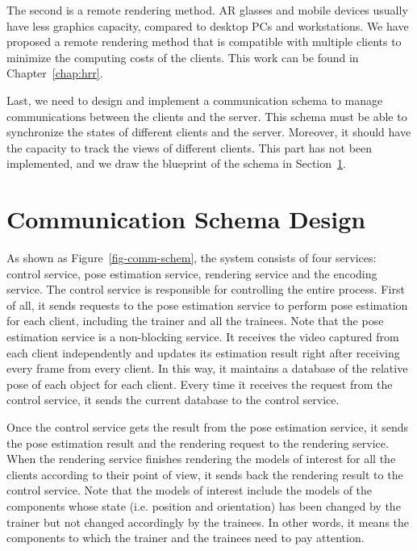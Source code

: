 The second is a remote rendering method.
AR glasses and mobile devices usually have less graphics capacity, compared to desktop PCs and workstations.
We have proposed a remote rendering method that is compatible with multiple clients to minimize the computing costs of the clients. This work can be found in Chapter~\ref{chap:hrr}.

Last, we need to design and implement a communication schema to manage communications between the clients and the server.
This schema must be able to synchronize the states of different clients and the server.
Moreover, it should have the capacity to track the views of different clients.
This part has not been implemented, and we draw the blueprint of the schema in Section~\ref{sec:dm:csd}.

\section{Communication Schema Design}
\label{sec:dm:csd}

As shown as Figure~\ref{fig-comm-schem}, the system consists of four services: control service, pose estimation service, rendering service and the encoding service.
The control service is responsible for controlling the entire process.
First of all, it sends requests to the pose estimation service to perform pose estimation for each client, including the trainer and all the trainees.
Note that the pose estimation service is a non-blocking service. It receives the video captured from each client independently and updates its estimation result right after receiving every frame from every client. In this way, it maintains a database of the relative pose of each object for each client. Every time it receives the request from the control service, it sends the current database to the control service.

Once the control service gets the result from the pose estimation service, it sends the pose estimation result and the rendering request to the rendering service.
When the rendering service finishes rendering the models of interest for all the clients according to their point of view, it sends back the rendering result to the control service.
Note that the models of interest include the models of the components whose state (i.e. position and orientation) has been changed by the trainer but not changed accordingly by the trainees. In other words, it means the components to which the trainer and the trainees need to pay attention.

